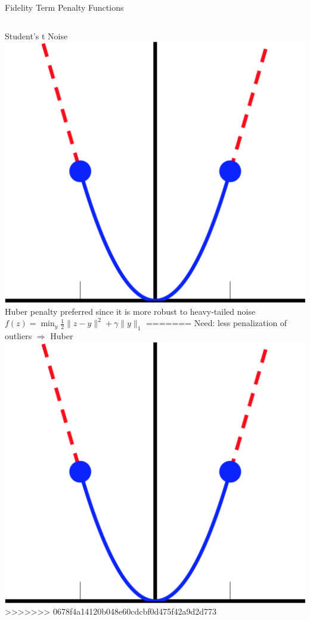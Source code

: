 \documentclass[12pt]{beamer}
\begin{document}
\begin{frame}{Fidelity Term Penalty Functions}
\begin{columns}[T]
\begin{column}{0.45\linewidth}
\begin{block}{Student's t Noise}
		\includegraphics[scale=0.1]{../figures/huber} \\
		{\footnotesize Huber penalty preferred since it is more robust to heavy-tailed noise} \\[1ex]
		$f(z) = \min_y \frac{1}{2} \| z-y \|^2 + \gamma \| y \|_1$
=======
		Need: less penalization of outliers $\Rightarrow$ Huber \\
		\includegraphics[scale=0.1]{../figures/huber}
>>>>>>> 0678f4a14120b048e60cdcbf0d475f42a9d2d773
		\end{block}
	\end{column}
\end{columns}

\end{frame}
\end{document}
